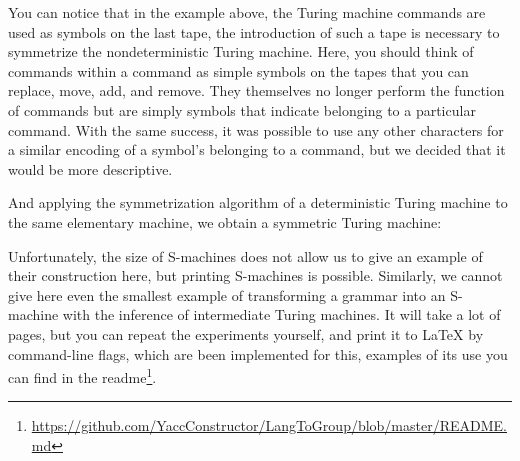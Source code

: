 \documentclass[conference]{IEEEtran}
\theoremstyle{definition}
\begin{document}
\begin{appendices}
You can notice that in the example above, the Turing machine commands are used as symbols on the last tape, the introduction of such a tape is necessary to symmetrize the nondeterministic Turing machine. Here, you should think of commands within a command as simple symbols on the tapes that you can replace, move, add, and remove. They themselves no longer perform the function of commands but are simply symbols that indicate belonging to a particular command. With the same success, it was possible to use any other characters for a similar encoding of a symbol's belonging to a command, but we decided that it would be more descriptive.

And applying the symmetrization algorithm of a deterministic Turing machine to the same elementary machine, we obtain a symmetric Turing machine:


Unfortunately, the size of S-machines does not allow us to give an example of their construction here, but printing S-machines is possible. Similarly, we cannot give here even the smallest example of transforming a grammar into an S-machine with the inference of intermediate Turing machines. It will take a lot of pages, but you can repeat the experiments yourself, and print it to LaTeX by command-line flags, which are been implemented for this, examples of its use you can find in the readme\footnote{\url{https://github.com/YaccConstructor/LangToGroup/blob/master/README.md}}.

\end{appendices}



\end{document}
